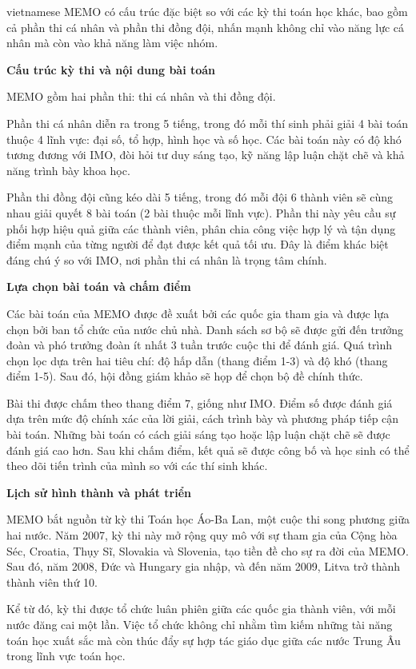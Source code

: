\documentclass{article}
\begin{document}
\begin{otherlanguage*}{vietnamese}
MEMO có cấu trúc đặc biệt so với các kỳ thi toán học khác, bao gồm cả phần thi cá nhân và phần thi đồng đội, nhấn mạnh không chỉ vào năng lực cá nhân mà còn vào khả năng làm việc nhóm.

\textbf{Cấu trúc kỳ thi và nội dung bài toán}

MEMO gồm hai phần thi: thi cá nhân và thi đồng đội.

Phần thi cá nhân diễn ra trong 5 tiếng, trong đó mỗi thí sinh phải giải 4 bài toán thuộc 4 lĩnh vực: đại số, tổ hợp, hình học và số học.
Các bài toán này có độ khó tương đương với IMO, đòi hỏi tư duy sáng tạo, kỹ năng lập luận chặt chẽ và khả năng trình bày khoa học.

Phần thi đồng đội cũng kéo dài 5 tiếng, trong đó mỗi đội 6 thành viên sẽ cùng nhau giải quyết 8 bài toán (2 bài thuộc mỗi lĩnh vực).
Phần thi này yêu cầu sự phối hợp hiệu quả giữa các thành viên, phân chia công việc hợp lý và tận dụng điểm mạnh của từng người để đạt được kết quả tối ưu.
Đây là điểm khác biệt đáng chú ý so với IMO, nơi phần thi cá nhân là trọng tâm chính.

\textbf{Lựa chọn bài toán và chấm điểm}

Các bài toán của MEMO được đề xuất bởi các quốc gia tham gia và được lựa chọn bởi ban tổ chức của nước chủ nhà.
Danh sách sơ bộ sẽ được gửi đến trưởng đoàn và phó trưởng đoàn ít nhất 3 tuần trước cuộc thi để đánh giá.
Quá trình chọn lọc dựa trên hai tiêu chí: độ hấp dẫn (thang điểm 1-3) và độ khó (thang điểm 1-5). Sau đó, hội đồng giám khảo sẽ họp để chọn bộ đề chính thức.

Bài thi được chấm theo thang điểm 7, giống như IMO. Điểm số được đánh giá dựa trên mức độ chính xác của lời giải, cách trình bày và phương pháp tiếp cận bài toán.
Những bài toán có cách giải sáng tạo hoặc lập luận chặt chẽ sẽ được đánh giá cao hơn.
Sau khi chấm điểm, kết quả sẽ được công bố và học sinh có thể theo dõi tiến trình của mình so với các thí sinh khác.

\textbf{Lịch sử hình thành và phát triển}

MEMO bắt nguồn từ kỳ thi Toán học Áo-Ba Lan, một cuộc thi song phương giữa hai nước.
Năm 2007, kỳ thi này mở rộng quy mô với sự tham gia của Cộng hòa Séc, Croatia, Thụy Sĩ, Slovakia và Slovenia, tạo tiền đề cho sự ra đời của MEMO.
Sau đó, năm 2008, Đức và Hungary gia nhập, và đến năm 2009, Litva trở thành thành viên thứ 10.

Kể từ đó, kỳ thi được tổ chức luân phiên giữa các quốc gia thành viên, với mỗi nước đăng cai một lần.
Việc tổ chức không chỉ nhằm tìm kiếm những tài năng toán học xuất sắc mà còn thúc đẩy sự hợp tác giáo dục giữa các nước Trung Âu trong lĩnh vực toán học.


\end{otherlanguage*}
\end{document}
